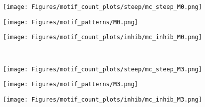 \documentclass[smallextended]{svjour3}       %
\theoremstyle{definition}
\begin{document}
 
\begin{figure}[]
	\centering
	\hfill
	\begin{minipage}{0.3\textwidth}%
		\texttt{[image: Figures/motif\_count\_plots/steep/mc\_steep\_M0.png]}	
	\end{minipage}
	\hfill
	\begin{minipage}{0\textwidth}%
		\texttt{[image: Figures/motif\_patterns/M0.png]}	
	\end{minipage}
	\hfill
	\begin{minipage}{0.35\textwidth}
		\texttt{[image: Figures/motif\_count\_plots/inhib/mc\_inhib\_M0.png]}
	\end{minipage}
	\hfill
	\\
	\hfill
	\begin{minipage}{0.30\textwidth}%
		\texttt{[image: Figures/motif\_count\_plots/steep/mc\_steep\_M3.png]}
	\end{minipage}
	\hfill
	\begin{minipage}{0\textwidth}%
		\texttt{[image: Figures/motif\_patterns/M3.png]}	
	\end{minipage}
	\hfill
	\begin{minipage}{0.35\textwidth}
		\texttt{[image: Figures/motif\_count\_plots/inhib/mc\_inhib\_M3.png]}
	\end{minipage}
	

\end{figure}
\end{document}

